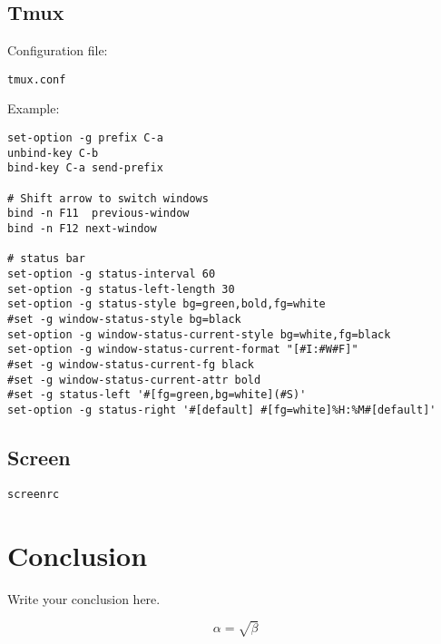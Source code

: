 \documentclass{article}
\begin{document}
\subsection{Tmux}

Configuration file:

\begin{verbatim}
tmux.conf
\end{verbatim}

Example:

\begin{verbatim}
set-option -g prefix C-a
unbind-key C-b
bind-key C-a send-prefix

# Shift arrow to switch windows
bind -n F11  previous-window
bind -n F12 next-window

# status bar
set-option -g status-interval 60
set-option -g status-left-length 30
set-option -g status-style bg=green,bold,fg=white
#set -g window-status-style bg=black
set-option -g window-status-current-style bg=white,fg=black
set-option -g window-status-current-format "[#I:#W#F]"
#set -g window-status-current-fg black
#set -g window-status-current-attr bold
#set -g status-left '#[fg=green,bg=white](#S)'
set-option -g status-right '#[default] #[fg=white]%H:%M#[default]'
\end{verbatim}

\subsection{Screen}

\begin{verbatim}
screenrc
\end{verbatim}

\section{Conclusion}

Write your conclusion here.

\begin{equation}
    \label{simple_equation}
    \alpha = \sqrt{\beta}
\end{equation}
\end{document}

